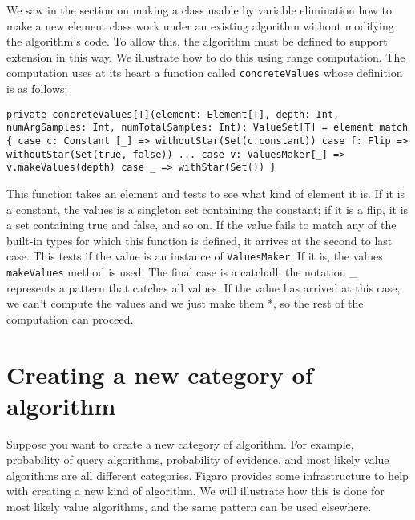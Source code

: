 We saw in the section on making a class usable by variable elimination how to make a new element class work under an existing algorithm without modifying the algorithm's code. To allow this, the algorithm must be defined to support extension in this way. We illustrate how to do this using range computation. The computation uses at its heart a function called \texttt{concreteValues} whose definition is as follows:


\begin{flushleft}
\texttt{private concreteValues[T](element: Element[T], depth: Int, numArgSamples: Int, numTotalSamples: Int): ValueSet[T] = element match \{
\newline \tab case c: Constant [\_] => withoutStar(Set(c.constant))
\newline \tab case f: Flip => withoutStar(Set(true, false))
\newline \tab ...
\newline \tab case v: ValuesMaker[\_] => v.makeValues(depth)
\newline \tab case \_ => withStar(Set())
\newline \}
}
\end{flushleft}

This function takes an element and tests to see what kind of element it is. If it is a constant, the values is a singleton set containing the constant; if it is a flip, it is a set containing true and false, and so on. If the value fails to match any of the built-in types for which this function is defined, it arrives at the second to last case. This tests if the value is an instance of \texttt{ValuesMaker}. If it is, the values \texttt{makeValues} method is used. The final case is a catchall: the notation \_ represents a pattern that catches all values. If the value has arrived at this case, we can't compute the values and we just make them *, so the rest of the computation can proceed.

\section{Creating a new category of algorithm}

Suppose you want to create a new category of algorithm. For example, probability of query algorithms, probability of evidence, and most likely value algorithms are all different categories. Figaro provides some infrastructure to help with creating a new kind of algorithm. We will illustrate how this is done for most likely value algorithms, and the same pattern can be used elsewhere.

